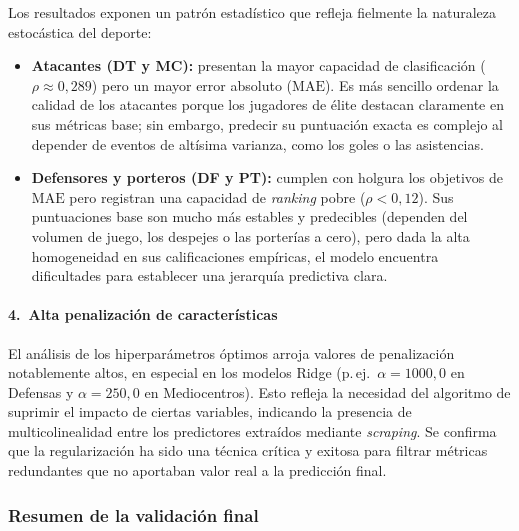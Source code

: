 Los resultados exponen un patrón estadístico que refleja fielmente la
naturaleza estocástica del deporte:

\begin{itemize}
  \item \textbf{Atacantes (DT y MC):} presentan la mayor capacidad de
        clasificación ($\rho \approx 0{,}289$) pero un mayor error
        absoluto ($\mathrm{MAE}$). Es más sencillo ordenar la calidad
        de los atacantes porque los jugadores de élite destacan
        claramente en sus métricas base; sin embargo, predecir su
        puntuación exacta es complejo al depender de eventos de altísima
        varianza, como los goles o las asistencias.

  \item \textbf{Defensores y porteros (DF y PT):} cumplen con holgura
        los objetivos de $\mathrm{MAE}$ pero registran una capacidad de
        \textit{ranking} pobre ($\rho < 0{,}12$). Sus puntuaciones base
        son mucho más estables y predecibles (dependen del volumen de
        juego, los despejes o las porterías a cero), pero dada la alta
        homogeneidad en sus calificaciones empíricas, el modelo encuentra
        dificultades para establecer una jerarquía predictiva clara.
\end{itemize}

\paragraph{4.\ Alta penalización de características}

El análisis de los hiperparámetros óptimos arroja valores de penalización
notablemente altos, en especial en los modelos Ridge (p.\,ej.\
$\alpha = 1000{,}0$ en Defensas y $\alpha = 250{,}0$ en Mediocentros).
Esto refleja la necesidad del algoritmo de suprimir el impacto de
ciertas variables, indicando la presencia de multicolinealidad entre
los predictores extraídos mediante \textit{scraping}. Se confirma que
la regularización ha sido una técnica crítica y exitosa para filtrar
métricas redundantes que no aportaban valor real a la predicción final.

\subsubsection{Resumen de la validación final}
\label{subsubsec:resumen_validacion}

